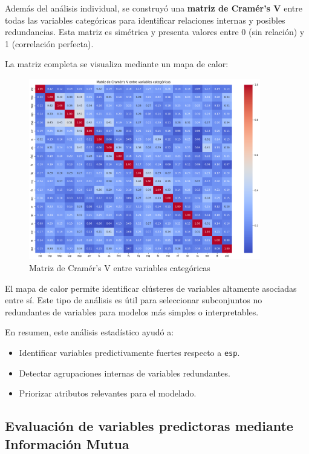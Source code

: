\documentclass[11pt,a4paper]{article}
\begin{document}
Además del análisis individual, se construyó una \textbf{matriz de Cramér’s V} entre todas las variables categóricas para identificar relaciones internas y posibles redundancias. Esta matriz es simétrica y presenta valores entre 0 (sin relación) y 1 (correlación perfecta).

\medskip

La matriz completa se visualiza mediante un mapa de calor:

\begin{figure}[H]
\centering
\includegraphics[width=0.9\textwidth]{img/matriz_cramers_v.png}
\caption*{Matriz de Cramér's V entre variables categóricas}
\end{figure}

\medskip

El mapa de calor permite identificar clústeres de variables altamente asociadas entre sí. Este tipo de análisis es útil para seleccionar subconjuntos no redundantes de variables para modelos más simples o interpretables.

\medskip

En resumen, este análisis estadístico ayudó a:

\begin{itemize}
    \item Identificar variables predictivamente fuertes respecto a \texttt{esp}.
    \item Detectar agrupaciones internas de variables redundantes.
    \item Priorizar atributos relevantes para el modelado.
\end{itemize}

\subsection{Evaluación de variables predictoras mediante Información Mutua}
\end{document}
